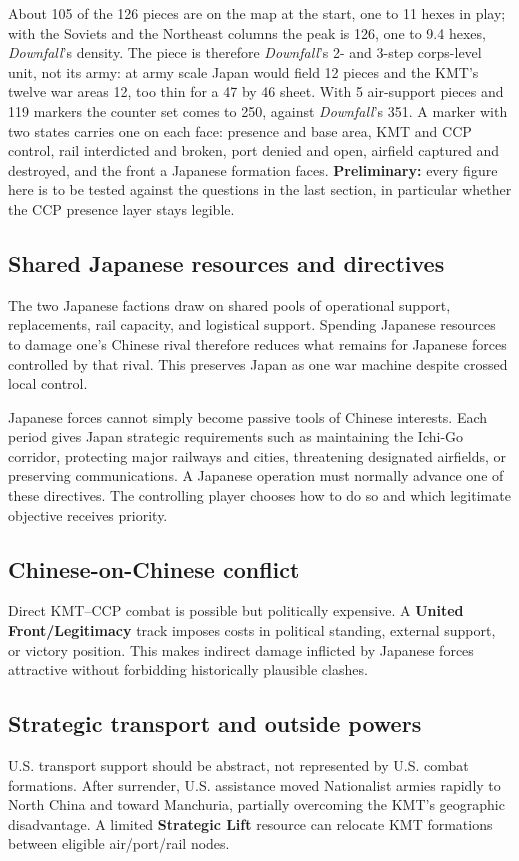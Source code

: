 \documentclass[11pt]{article}
\begin{document}
About 105 of the 126 pieces are on the map at the start, one to 11 hexes in play; with the Soviets and the Northeast columns the peak is 126, one to 9.4 hexes, \emph{Downfall}'s density. The piece is therefore \emph{Downfall}'s 2- and 3-step corps-level unit, not its army: at army scale Japan would field 12 pieces and the KMT's twelve war areas 12, too thin for a 47 by 46 sheet. With 5 air-support pieces and 119 markers the counter set comes to 250, against \emph{Downfall}'s 351. A marker with two states carries one on each face: presence and base area, KMT and CCP control, rail interdicted and broken, port denied and open, airfield captured and destroyed, and the front a Japanese formation faces. \textbf{Preliminary:} every figure here is to be tested against the questions in the last section, in particular whether the CCP presence layer stays legible.

\subsection{Shared Japanese resources and directives}
The two Japanese factions draw on shared pools of operational support, replacements, rail capacity, and logistical support. Spending Japanese resources to damage one's Chinese rival therefore reduces what remains for Japanese forces controlled by that rival. This preserves Japan as one war machine despite crossed local control.

Japanese forces cannot simply become passive tools of Chinese interests. Each period gives Japan strategic requirements such as maintaining the Ichi-Go corridor, protecting major railways and cities, threatening designated airfields, or preserving communications. A Japanese operation must normally advance one of these directives. The controlling player chooses how to do so and which legitimate objective receives priority.

\subsection{Chinese-on-Chinese conflict}
Direct KMT--CCP combat is possible but politically expensive. A \textbf{United Front/Legitimacy} track imposes costs in political standing, external support, or victory position. This makes indirect damage inflicted by Japanese forces attractive without forbidding historically plausible clashes.

\subsection{Strategic transport and outside powers}
U.S. transport support should be abstract, not represented by U.S. combat formations. After surrender, U.S. assistance moved Nationalist armies rapidly to North China and toward Manchuria, partially overcoming the KMT's geographic disadvantage. A limited \textbf{Strategic Lift} resource can relocate KMT formations between eligible air/port/rail nodes.
\end{document}
